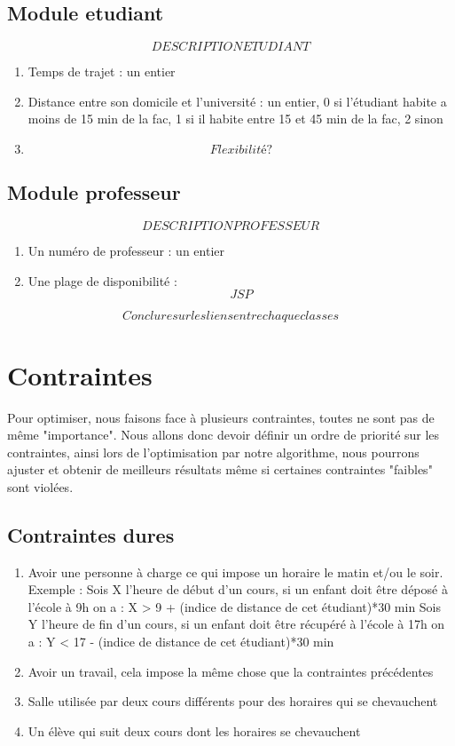 \documentclass[a4paper,11pt]{article}
\begin{document}
	\subsection{Module etudiant}
		$$DESCRIPTION ETUDIANT$$
		\begin{enumerate}
			\item Temps de trajet : un entier
			\item Distance entre son domicile et l'université : un entier, 0 si l'étudiant habite a moins de 15 min de la fac, 1 si il habite
			entre 15 et 45 min de la fac, 2 sinon
			\item $$Flexibilité ?$$
			\end{enumerate}
	\subsection{Module professeur}
		$$DESCRIPTION PROFESSEUR$$
		\begin{enumerate}
			\item Un numéro de professeur : un entier
			\item Une plage de disponibilité : $$JSP$$
			\end{enumerate}
	$$Conclure sur les liens entre chaque classes$$
\section{Contraintes}
	Pour optimiser, nous faisons face à plusieurs contraintes, toutes ne sont pas 
	de même "importance". Nous allons donc devoir définir un ordre de priorité sur 
	les contraintes, ainsi lors de l'optimisation par notre algorithme, nous 
	pourrons ajuster et obtenir de meilleurs résultats même si certaines contraintes
	"faibles" sont violées.\\
	\subsection{Contraintes dures}
		\begin{enumerate}
			\item Avoir une personne à charge ce qui impose un horaire le matin et/ou le soir.
			Exemple : Sois X l'heure de début d'un cours, si un enfant doit être déposé à l'école à 9h on a : X > 9 + (indice de distance de cet étudiant)*30 min
					  Sois Y l'heure de fin d'un cours, si un enfant doit être récupéré à l'école à 17h on a : Y < 17 - (indice de distance de cet étudiant)*30 min
			\item Avoir un travail, cela impose la même chose que la contraintes précédentes
			\item Salle utilisée par deux cours différents pour des horaires 
				qui se chevauchent
			\item Un élève qui suit deux cours dont les horaires se chevauchent
		\end{enumerate}
\end{document}
